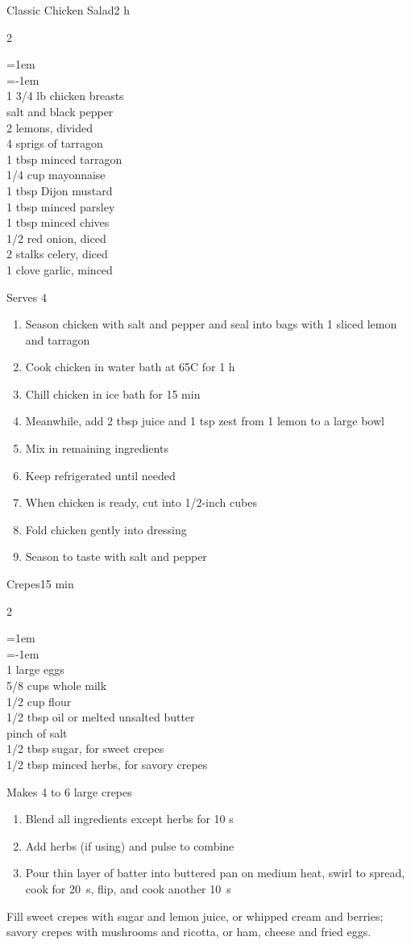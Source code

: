 \documentclass{article}
\newenvironment{recipe}[3][]
    {\begin{cardbase}[#1]{#2}{#3}
    \columnratio{0.333}
    \begin{paracol}{2}}
    {\end{paracol}\end{cardbase}}
\newenvironment{denserecipe}[3][]
    {\small
    \begin{recipe}[#1]{#2}{#3}}
    {\end{recipe}}
\newcommand{\nextcolumn}{\switchcolumn}
\newenvironment{ingredients}
    {
    \begin{obeylines}
    \vspace{\parskip}
    \setlength{\parskip}{0.25em}
    \vspace{-0.25em}
    \leftskip=1em
    \parindent=-1em}
    {\end{obeylines}}
\newenvironment{steps}
    {\begin{enumerate}[leftmargin=*,topsep=0pt]}
    {\end{enumerate}}
\newcommand{\celsius}[1]{#1\textdegree{}C}
\newcommand{\tag}[1]{\hspace{1em}#1}
\newcommand{\symboltag}[2]{\tag{#1\hspace{0.4em}#2}}
\newcommand{\totaltime}[1]{\symboltag{\raisebox{-0.1em}{\small\StopWatchEnd}}{#1}}
\begin{document}
\begin{denserecipe}{Classic Chicken Salad}{\totaltime{2 h}}
\begin{ingredients}
1 3/4 lb chicken breasts
salt and black pepper
2 lemons, divided
4 sprigs of tarragon
1 tbsp minced tarragon
1/4 cup mayonnaise
1 tbsp Dijon mustard
1 tbsp minced parsley
1 tbsp minced chives
1/2 red onion, diced
2 stalks celery, diced
1 clove garlic, minced
\end{ingredients}
\nextcolumn
Serves 4
\begin{steps}
    \item Season chicken with salt and pepper and seal into bags with 1 sliced lemon and tarragon
    \item Cook chicken in water bath at \celsius{65} for 1 h
    \item Chill chicken in ice bath for 15 min
    \item Meanwhile, add 2 tbsp juice and 1 tsp zest from 1 lemon to a large bowl
    \item Mix in remaining ingredients
    \item Keep refrigerated until needed
    \item When chicken is ready, cut into 1/2-inch cubes
    \item Fold chicken gently into dressing
    \item Season to taste with salt and pepper
\end{steps}
\end{denserecipe}

\begin{recipe}{Crepes}{\totaltime{15 min}}
\begin{ingredients}
1 large eggs
5/8 cups whole milk
1/2 cup flour
1/2 tbsp oil or melted unsalted butter
pinch of salt
1/2 tbsp sugar, for sweet crepes
1/2 tbsp minced herbs, for savory crepes
\end{ingredients}
\nextcolumn
Makes 4 to 6 large crepes
\begin{steps}
    \item Blend all ingredients except herbs for 10 s
    \item Add herbs (if using) and pulse to combine
    \item Pour thin layer of batter into buttered pan on medium heat, swirl to spread, cook for 20~s, flip, and cook another 10~s
\end{steps}
Fill sweet crepes with sugar and lemon juice, or whipped cream and berries; savory crepes with mushrooms and ricotta, or ham, cheese and fried eggs.
\end{recipe}
\end{document}
